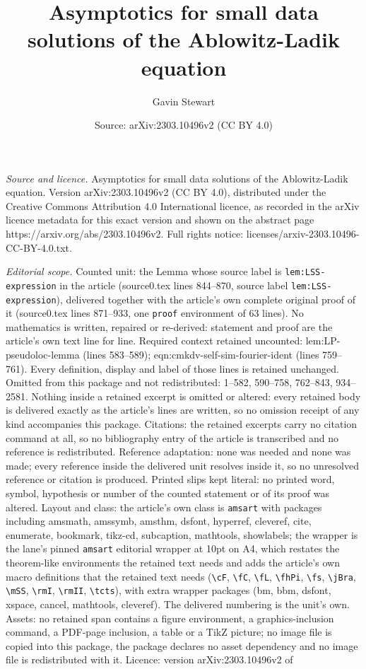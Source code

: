 \documentclass[10pt,a4paper]{amsart}
\title[Asymptotics for small data solutions of the Ablowitz-Ladik e]{Asymptotics for small data solutions of the Ablowitz-Ladik equation}
\author{Gavin Stewart}
\date{Source: arXiv:2303.10496v2 (CC BY 4.0)}
\begin{document}
\maketitle

\noindent\emph{Source and licence.} Asymptotics for small data solutions of the Ablowitz-Ladik equation. Version arXiv:2303.10496v2 (CC BY 4.0), distributed under the Creative Commons Attribution 4.0 International licence, as recorded in the arXiv licence metadata for this exact version and shown on the abstract page https://arxiv.org/abs/2303.10496v2. Full rights notice: licenses/arxiv-2303.10496-CC-BY-4.0.txt.\par\smallskip

\noindent\textit{Editorial scope.} Counted unit: the Lemma whose source label is \texttt{lem:LSS-expression} in the article (source0.tex lines 844--870, source label \texttt{lem:LSS-expression}), delivered together with the article's own complete original proof of it (source0.tex lines 871--933, one \texttt{proof} environment of 63 lines). No mathematics is written, repaired or re-derived: statement and proof are the article's own text line for line. Required context retained uncounted: lem:LP-pseudoloc-lemma (lines 583--589); eqn:cmkdv-self-sim-fourier-ident (lines 759--761). Every definition, display and label of those lines is retained unchanged. Omitted from this package and not redistributed: 1--582, 590--758, 762--843, 934--2581. Nothing inside a retained excerpt is omitted or altered: every retained body is delivered exactly as the article's lines are written, so no omission receipt of any kind accompanies this package. Citations: the retained excerpts carry no citation command at all, so no bibliography entry of the article is transcribed and no reference is redistributed. Reference adaptation: none was needed and none was made; every reference inside the delivered unit resolves inside it, so no unresolved reference or citation is produced. Printed slips kept literal: no printed word, symbol, hypothesis or number of the counted statement or of its proof was altered. Layout and class: the article's own class is \texttt{amsart} with packages including amsmath, amssymb, amsthm, dsfont, hyperref, cleveref, cite, enumerate, bookmark, tikz-cd, subcaption, mathtools, showlabels; the wrapper is the lane's pinned \texttt{amsart} editorial wrapper at 10pt on A4, which restates the theorem-like environments the retained text needs and adds the article's own macro definitions that the retained text needs (\texttt{\textbackslash cF}, \texttt{\textbackslash fC}, \texttt{\textbackslash fL}, \texttt{\textbackslash fhPi}, \texttt{\textbackslash fs}, \texttt{\textbackslash jBra}, \texttt{\textbackslash mSS}, \texttt{\textbackslash rmI}, \texttt{\textbackslash rmII}, \texttt{\textbackslash tcts}), with extra wrapper packages (bm, bbm, dsfont, xspace, cancel, mathtools, cleveref). The delivered numbering is the unit's own. Assets: no retained span contains a figure environment, a graphics-inclusion command, a PDF-page inclusion, a table or a TikZ picture; no image file is copied into this package, the package declares no asset dependency and no image file is redistributed with it. Licence: version arXiv:2303.10496v2 of 
\end{document}
